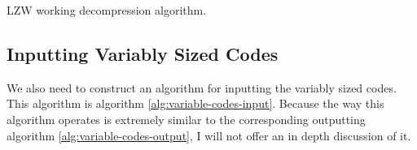 \begin{algorithm}[H]
  \caption{LZW working decompression algorithm.}
  \label{alg:lzw-working-decompression}
  \begin{algorithmic}[1]

    \State {}

    \State {}




       
      \Else
      \EndIf

      \State {}

       

        \State {}

      \EndIf



    \EndWhile
  \end{algorithmic}
\end{algorithm}

\subsection{Inputting Variably Sized Codes}

We also need to construct an algorithm for inputting the variably
sized codes. This algorithm is algorithm
\ref{alg:variable-codes-input}. Because the way this algorithm
operates is extremely similar to the corresponding outputting
algorithm \ref{alg:variable-codes-output}, I will not offer an in
depth discussion of it.

